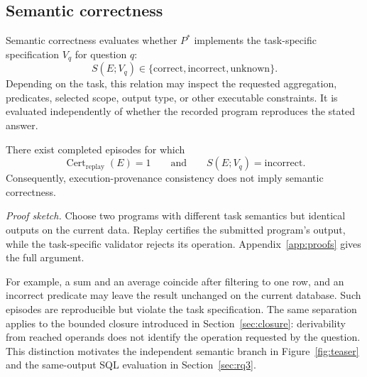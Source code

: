 \subsection{Semantic correctness}
\label{sec:nonimplication}

Semantic correctness evaluates whether $P^*$ implements the
task-specific specification $V_q$ for question $q$:
\[
S(E;V_q)
\in
\{
\mathrm{correct},
\mathrm{incorrect},
\mathrm{unknown}
\}.
\]
Depending on the task, this relation may inspect the requested
aggregation, predicates, selected scope, output type, or other
executable constraints. It is evaluated independently of whether
the recorded program reproduces the stated answer.

\begin{proposition}
\label{prop:semantic}
There exist completed episodes for which
\[
\operatorname{Cert}_{\mathrm{replay}}(E)=1
\qquad\text{and}\qquad
S(E;V_q)=\mathrm{incorrect}.
\]
Consequently, execution-provenance consistency does not imply
semantic correctness.
\end{proposition}

\noindent\emph{Proof sketch.}
Choose two programs with different task semantics but identical
outputs on the current data. Replay certifies the submitted
program's output, while the task-specific validator rejects its
operation. Appendix~\ref{app:proofs} gives the full argument.

For example, a sum and an average coincide after filtering to one
row, and an incorrect predicate may leave the result unchanged on
the current database. Such episodes are reproducible but violate
the task specification. The same separation applies to the bounded
closure introduced in Section~\ref{sec:closure}: derivability from
reached operands does not identify the operation requested by the
question. This distinction motivates the independent semantic
branch in Figure~\ref{fig:teaser} and the same-output SQL evaluation
in Section~\ref{sec:rq3}.